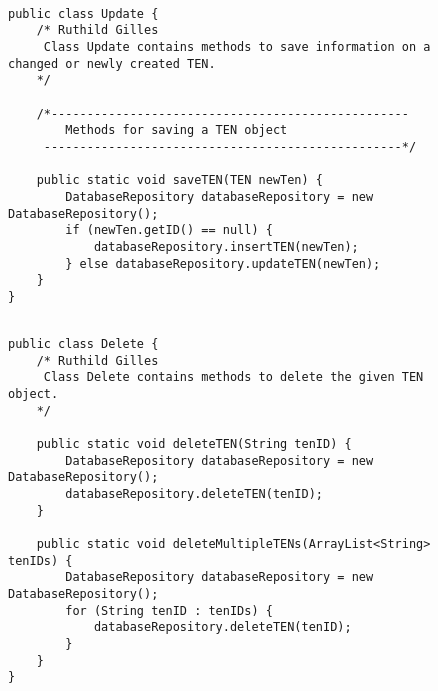 \begin{figure}[H]
\begin{lstlisting}[caption=Update (Ruthild Gilles)]

public class Update {
    /* Ruthild Gilles
     Class Update contains methods to save information on a changed or newly created TEN.
    */

    /*--------------------------------------------------
        Methods for saving a TEN object
     --------------------------------------------------*/

    public static void saveTEN(TEN newTen) {
        DatabaseRepository databaseRepository = new DatabaseRepository();
        if (newTen.getID() == null) {
            databaseRepository.insertTEN(newTen);
        } else databaseRepository.updateTEN(newTen);
    }
}
\end{lstlisting}
\end{figure}

\begin{figure}[H]
\begin{lstlisting}[caption=Delete (Ruthild Gilles)]

public class Delete {
    /* Ruthild Gilles
     Class Delete contains methods to delete the given TEN object.
    */

    public static void deleteTEN(String tenID) {
        DatabaseRepository databaseRepository = new DatabaseRepository();
        databaseRepository.deleteTEN(tenID);
    }

    public static void deleteMultipleTENs(ArrayList<String> tenIDs) {
        DatabaseRepository databaseRepository = new DatabaseRepository();
        for (String tenID : tenIDs) {
            databaseRepository.deleteTEN(tenID);
        }
    }
}
\end{lstlisting}
\end{figure}

